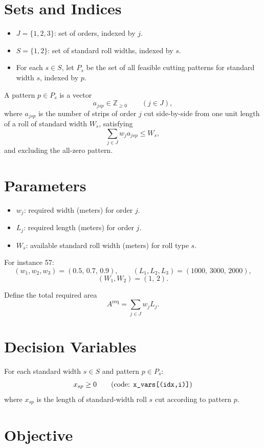 \section*{Sets and Indices}

\begin{itemize}
    \item $J=\{1,2,3\}$: set of orders, indexed by $j$.
    \item $S=\{1,2\}$: set of standard roll widths, indexed by $s$.
    \item For each $s \in S$, let $P_s$ be the set of all feasible cutting patterns for standard width $s$, indexed by $p$.
\end{itemize}

A pattern $p \in P_s$ is a vector
\[
a_{jsp} \in \mathbb{Z}_{\ge 0} \qquad (j \in J),
\]
where $a_{jsp}$ is the number of strips of order $j$ cut side-by-side from one unit length of a roll of standard width $W_s$, satisfying
\[
\sum_{j \in J} w_j a_{jsp} \le W_s,
\]
and excluding the all-zero pattern.

\section*{Parameters}

\begin{itemize}
    \item $w_j$: required width (meters) for order $j$.
    \item $L_j$: required length (meters) for order $j$.
    \item $W_s$: available standard roll width (meters) for roll type $s$.
\end{itemize}

For instance 57:
\[
(w_1,w_2,w_3)=(0.5,\,0.7,\,0.9), \qquad
(L_1,L_2,L_3)=(1000,\,3000,\,2000),
\]
\[
(W_1,W_2)=(1,\,2).
\]

Define the total required area
\[
A^{\mathrm{req}}=\sum_{j\in J} w_j L_j.
\]

\section*{Decision Variables}

For each standard width $s \in S$ and pattern $p \in P_s$:
\[
x_{sp} \ge 0 \qquad \text{(code: \texttt{x\_vars[(idx,i)]})}
\]
where $x_{sp}$ is the length of standard-width roll $s$ cut according to pattern $p$.

\section*{Objective}

